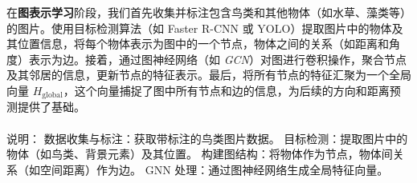 在\textbf{图表示学习}阶段，我们首先收集并标注包含鸟类和其他物体（如水草、藻类等）的图片。使用目标检测算法（如 Faster R-CNN 或 YOLO）提取图片中的物体及其位置信息，将每个物体表示为图中的一个节点，物体之间的关系（如距离和角度）表示为边。接着，通过图神经网络（如 \textit{GCN}）对图进行卷积操作，聚合节点及其邻居的信息，更新节点的特征表示。最后，将所有节点的特征汇聚为一个全局向量 \( H_{\text{global}} \)，这个向量捕捉了图中所有节点和边的信息，为后续的方向和距离预测提供了基础。

\begin{figure}[h!]
\centering %
\end{figure}

\paragraph{}
说明：
数据收集与标注：获取带标注的鸟类图片数据。
目标检测：提取图片中的物体（如鸟类、背景元素）及其位置。
构建图结构：将物体作为节点，物体间关系（如空间距离）作为边。
GNN 处理：通过图神经网络生成全局特征向量。